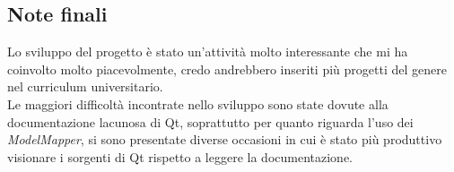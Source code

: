 \subsection{Note finali}
Lo sviluppo del progetto è stato un'attività molto interessante che mi ha coinvolto molto piacevolmente, credo
andrebbero inseriti più progetti del genere nel curriculum universitario.\\
Le maggiori difficoltà incontrate nello sviluppo sono state dovute alla documentazione lacunosa di Qt, soprattutto per
quanto riguarda l'uso dei \textit{ModelMapper}, si sono presentate diverse occasioni in cui è stato più produttivo
visionare i sorgenti di Qt rispetto a leggere la documentazione.

